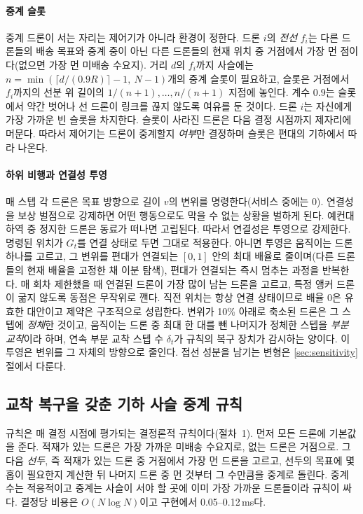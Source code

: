 \documentclass[final,5p,times,twocolumn]{elsarticle}
\begin{document}
\paragraph{중계 슬롯}
중계 드론이 서는 자리는 제어기가 아니라 환경이 정한다. 드론 $i$의 \emph{전선} $f_i$는 다른
드론들의 배송 목표와 중계 중이 아닌 다른 드론들의 현재 위치 중 거점에서 가장 먼 점이다(없으면 가장
먼 미배송 수요지). 거리 $d$의 $f_i$까지 사슬에는 $n = \min(\lceil d/(0.9R) \rceil - 1,\ N-1)$개의
중계 슬롯이 필요하고, 슬롯은 거점에서 $f_i$까지의 선분 위 길이의 $1/(n+1), \dots, n/(n+1)$
지점에 놓인다. 계수 $0.9$는 슬롯에서 약간 벗어나 선 드론이 링크를 끊지 않도록 여유를 둔 것이다.
드론 $i$는 자신에게 가장 가까운 빈 슬롯을 차지한다. 슬롯이 사라진 드론은 다음 결정 시점까지 제자리에
머문다. 따라서 제어기는 드론이 중계할지 \emph{여부}만 결정하며 슬롯은 편대의 기하에서 따라 나온다.

\paragraph{하위 비행과 연결성 투영}
매 스텝 각 드론은 목표 방향으로 길이 $v$의 변위를 명령한다(서비스 중에는 0). 연결성을 보상
벌점으로 강제하면 어떤 행동으로도 막을 수 없는 상황을 벌하게 된다. 예컨대 하역 중 정지한 드론은
동료가 떠나면 고립된다. 따라서 연결성은 투영으로 강제한다. 명령된 위치가 $G_t$를 연결 상태로
두면 그대로 적용한다. 아니면 투영은 움직이는 드론 하나를 고르고, 그 변위를 편대가 연결되는 $[0,1]$
안의 최대 배율로 줄이며(다른 드론들의 현재 배율을 고정한 채 이분 탐색), 편대가 연결되는 즉시
멈추는 과정을 반복한다. 매 회차 제한했을 때 연결된 드론이 가장 많이 남는 드론을 고르고, 특정 앵커
드론이 굶지 않도록 동점은 무작위로 깬다. 직전 위치는 항상 연결 상태이므로 배율 0은 유효한 대안이고
제약은 구조적으로 성립한다. 변위가 10\% 아래로 축소된 드론은 그 스텝에 \emph{정체}한 것이고,
움직이는 드론 중 최대 한 대를 뺀 나머지가 정체한 스텝을 \emph{부분 교착}이라 하며, 연속 부분 교착
스텝 수 $\delta_t$가 규칙의 복구 장치가 감시하는 양이다. 이 투영은 변위를 그 자체의 방향으로
줄인다. 접선 성분을 남기는 변형은 \ref{sec:sensitivity}절에서 다룬다.

\subsection{교착 복구을 갖춘 기하 사슬 중계 규칙}
\label{sec:heuristic}

규칙은 매 결정 시점에 평가되는 결정론적 규칙이다(절차~1). 먼저 모든 드론에 기본값을 준다.
적재가 있는 드론은 가장 가까운 미배송 수요지로, 없는 드론은 거점으로. 그 다음 \emph{선두}, 즉 적재가
있는 드론 중 거점에서 가장 먼 드론을 고르고, 선두의 목표에 몇 홉이 필요한지 계산한 뒤 나머지 드론
중 먼 것부터 그 수만큼을 중계로 돌린다. 중계 수는 적응적이고 중계는 사슬이 서야 할 곳에 이미
가장 가까운 드론들이라 규칙이 싸다. 결정당 비용은 $O(N \log N)$이고 구현에서
0.05--0.12\,ms다.
\end{document}
